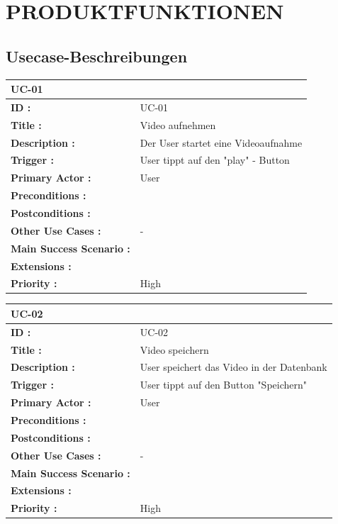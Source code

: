 		
	\section{\Large PRODUKTFUNKTIONEN}
	\subsection{Usecase-Beschreibungen}
	\begin{table}[H]
		\begin{tabular}{|p{8cm}|p{8cm}|}
			\hline
			\textbf{UC-01 } \\ 
			\hline
			\textbf{ID :}\centering & UC-01  \\ \hline 
			\textbf{Title :}\centering & Video aufnehmen \\ \hline 
			\textbf{Description :}\centering & Der User startet eine Videoaufnahme \\ \hline 
			\textbf{Trigger :}\centering & User tippt auf den "play" - Button \\ \hline 
			\textbf{Primary Actor :} \centering & User \\ \hline 
			\textbf{Preconditions :}\centering & 
				\\ \hline 
			\textbf{Postconditions :}\centering &  
			 \\ \hline
			\textbf{Other Use Cases :}\centering & - \\ \hline  
			\textbf{Main Success Scenario :}\centering & 
			 \\ \hline  
			\textbf{Extensions :}\centering & \\ \hline  
			\textbf{Priority :}\centering & High \\ \hline  
		\end{tabular}
	\end{table}	
	
	\begin{table}[H]
		\begin{tabular}{|p{8cm}|p{8cm}|}
			\hline
			\textbf{UC-02 } \\ 
			\hline
			\textbf{ID :}\centering & UC-02  \\ \hline 
			\textbf{Title :}\centering & Video speichern \\ \hline 
			\textbf{Description :}\centering & User speichert das Video in der Datenbank \\ \hline 
			\textbf{Trigger :}\centering & User tippt auf den Button "Speichern" \\ \hline 
			\textbf{Primary Actor :} \centering & User \\ \hline 
			\textbf{Preconditions :}\centering & 
			\\ \hline 
			\textbf{Postconditions :}\centering & 
			 \\ \hline
			\textbf{Other Use Cases :}\centering & - \\ \hline  
			\textbf{Main Success Scenario :}\centering & 
			\\ \hline  
			\textbf{Extensions :}\centering &  \\ \hline  
			\textbf{Priority :}\centering & High \\ \hline  
		\end{tabular}
	\end{table}
	
